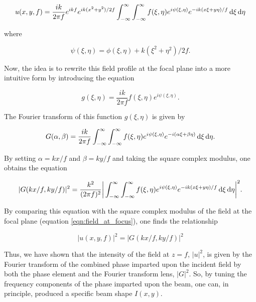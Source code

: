 \begin{equation}
\label{eqn:field_at_focus}
	u(x,y,f)=\frac{ik}{2\pi f}e^{ikf}e^{ik(x^2+y^2)/2f}\int_{-\infty}^{\infty}\int_{-\infty}^{\infty}f(\xi,\eta)e^{i\psi(\xi,\eta)}
	e^{-ik(x\xi + y\eta)/f}\mathop{}\!\mathrm{d}\xi\mathop{}\!\mathrm{d}\eta
\end{equation}

where

\begin{equation}
	\psi(\xi,\eta)=\phi(\xi,\eta) + k(\xi^2 + \eta^2)/2f.
\end{equation}

Now, the idea is to rewrite this field profile at the focal plane into a more intuitive form by introducing the equation

\begin{equation}
	g(\xi,\eta)=\frac{ik}{2\pi f}f(\xi,\eta)e^{i\psi(\xi,\eta)}.
\end{equation}

The Fourier transform of this function $g(\xi,\eta)$ is given by

\begin{equation}
	G(\alpha,\beta)=\frac{ik}{2\pi f}\int_{-\infty}^{\infty}\int_{-\infty}^{\infty}f(\xi,\eta)e^{i\psi(\xi,\eta)}
	e^{-i(\alpha\xi + \beta\eta)}\mathop{}\!\mathrm{d}\xi\mathop{}\!\mathrm{d}\eta.
\end{equation}

By setting $\alpha=kx/f$ and $\beta = ky/f$ and taking the square complex modulus, one obtains the equation

\begin{equation}
	\rvert G(kx/f,ky/f)\rvert^{2} = \frac{k^2}{(2\pi f)^2} \bigg\rvert\int_{-\infty}^{\infty}\int_{-\infty}^{\infty}
	f(\xi,\eta)e^{i\psi(\xi,\eta)}e^{-ik(x\xi+y\eta)/f}\mathop{}\!\mathrm{d}\xi\mathop{}\!\mathrm{d}\eta\bigg\rvert^{2}.
\end{equation}

By comparing this equation with the square complex modulus of the field at the focal plane (equation \ref{eqn:field_at_focus}), one finds the relationship

\begin{equation}
	\rvert u(x,y,f)\rvert^2 = \rvert G(kx/f,ky/f)\rvert^2
\end{equation}

Thus, we have shown that the intensity of the field at $z=f$, $\rvert u \rvert^2$, is given by the Fourier transform of the combined phase imparted upon the incident field by both the phase element and the Fourier transform lens, $\rvert G\rvert^2$.  So, by tuning the frequency components of the phase imparted upon the beam, one can, in principle, produced a specific beam shape $I(x,y)$.

